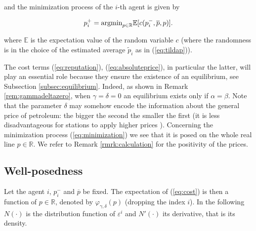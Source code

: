 \documentclass[graybox]{svmult}
\begin{document}
\noindent
and the minimization process of the $i$-th agent is given by

\begin{equation}
\label{eq:minimization}
p_i^+={\rm argmin}_{p\in\mathbb{R}}\mathbb{E}[c(p_i^-,\overline p,p)].
\end{equation}

\noindent
where $\mathbb{E}$ is the expectation value of the random variable $c$ (where the randomness is in the choice of the estimated average $\tilde p_i$ as in (\ref{eq:tildap})).

\begin{remark}
\label{rmrk:minimum}
The cost terms (\ref{eq:reputation}), (\ref{eq:absoluteprice}), in particular the latter, will play an essential role because they ensure the existence of an equilibrium, see Subsection \ref{subsec:equilibrium}. Indeed, as shown in Remark \ref{rem:gammadeltazero}, when $\gamma=\delta=0$ an equilibrium exists only if $\alpha=\beta$. Note that the parameter $\delta$ may somehow encode the information about the general price of petroleum: the bigger the second the smaller the first (it is less disadvantageous for stations to apply higher prices
). Concerning the minimization process (\ref{eq:minimization}) we see that it is posed on the whole real line $p\in\mathbb{R}$. We refer to Remark \ref{rmrk:calculation} for the positivity of the prices.



\end{remark}

\subsection{Well-posedness}
\label{subs:wellposedness}

 Let the agent $i$, $p_i^-$ and $\overline p$ be fixed. The expectation of  (\ref{eq:cost}) is then a function of $p\in\mathbb{R}$, denoted by $\varphi_{\gamma,\delta}(p)$ (dropping the index $i$). In the following $N(\cdot)$ is the distribution function of $\varepsilon^i$ and $N'(\cdot)$ its derivative, that is its density.
\end{document}
